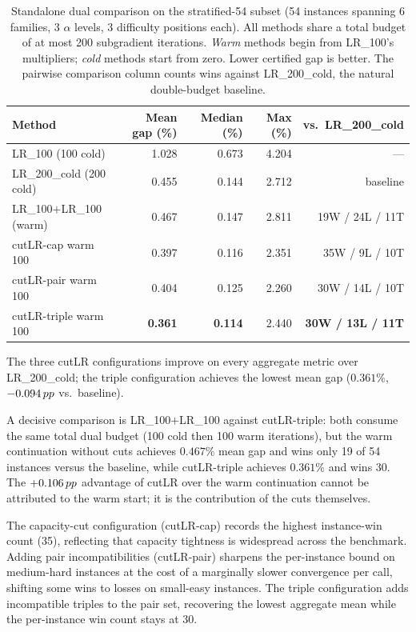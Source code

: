 \begin{table}[htbp]
\centering
\caption{Standalone dual comparison on the stratified-54 subset (54 instances
spanning 6 families, 3 $\alpha$ levels, 3 difficulty positions each).  All
methods share a total budget of at most 200 subgradient iterations.  \emph{Warm}
methods begin from LR\_100's multipliers; \emph{cold} methods start from zero.
Lower certified gap is better.  The pairwise comparison column counts wins
against LR\_200\_cold, the natural double-budget baseline.}
\label{tab:cutlr-standalone}
\small
\begin{tabular}{lrrrr}
\toprule
Method & Mean gap (\%) & Median (\%) & Max (\%) & vs.\ LR\_200\_cold \\
\midrule
LR\_100 (100 cold) & 1.028 & 0.673 & 4.204 & --- \\
LR\_200\_cold (200 cold) & 0.455 & 0.144 & 2.712 & baseline \\
LR\_100$+$LR\_100 (warm) & 0.467 & 0.147 & 2.811 & 19W / 24L / 11T \\
\midrule
cutLR-cap warm 100 & 0.397 & 0.116 & 2.351 & 35W / 9L / 10T \\
cutLR-pair warm 100 & 0.404 & 0.125 & 2.260 & 30W / 14L / 10T \\
cutLR-triple warm 100 & \textbf{0.361} & \textbf{0.114} & 2.440 & \textbf{30W / 13L / 11T} \\
\bottomrule
\end{tabular}
\end{table}

The three cutLR configurations improve on every aggregate metric over
LR\_200\_cold; the triple configuration achieves the lowest mean gap
($0.361\%$, $-0.094\,pp$ vs.\ baseline).

A decisive comparison is LR\_100$+$LR\_100 against cutLR-triple: both consume
the same total dual budget (100 cold then 100 warm iterations), but the warm
continuation without cuts achieves $0.467\%$ mean gap and wins only 19 of 54
instances versus the baseline, while cutLR-triple achieves $0.361\%$ and wins
30. The $+0.106\,pp$ advantage of cutLR over the warm continuation cannot be
attributed to the warm start; it is the contribution of the cuts themselves.

The capacity-cut configuration (cutLR-cap) records the highest instance-win
count (35), reflecting that capacity tightness is widespread across the
benchmark. Adding pair incompatibilities (cutLR-pair) sharpens the per-instance
bound on medium-hard instances at the cost of a marginally slower convergence
per call, shifting some wins to losses on small-easy instances. The triple
configuration adds incompatible triples to the pair set, recovering the lowest
aggregate mean while the per-instance win count stays at 30.
